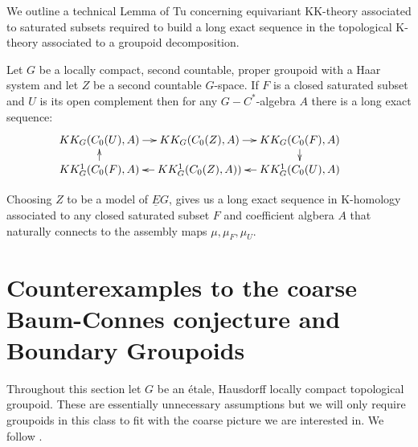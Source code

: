 We outline a technical Lemma of Tu concerning equivariant KK-theory associated to saturated subsets required to build a long exact sequence in the topological K-theory associated to a groupoid decomposition.

\begin{lemma}
Let $G$ be a locally compact, second countable, proper groupoid with a Haar system and let $Z$ be a second countable $G$-space. If $F$ is a closed saturated subset and $U$ is its open complement then for any $G-C^{*}$-algebra $A$ there is a long exact sequence:
\begin{equation*}
\xymatrix@=1em{
KK_{G}(C_{0}(U),A) \ar[r] & KK_{G}(C_{0}(Z),A) \ar[r]& KK_{G}(C_{0}(F),A)\ar[d] & \\
KK^{1}_{G}(C_{0}(F),A)\ar[u]& KK^{1}_{G}(C_{0}(Z),A)) \ar[l]& KK^{1}_{G}(C_{0}(U),A)\ar[l] &
}
\end{equation*}
\end{lemma}

Choosing $Z$ to be a model of $\underline{E}G$, gives us a long exact sequence in K-homology associated to any closed saturated subset $F$ and coefficient algbera $A$ that naturally connects to the assembly maps $\mu, \mu_{F}, \mu_{U}$.

\section{Counterexamples to the coarse Baum-Connes conjecture and Boundary Groupoids}\label{Sect:CE}

Throughout this section let $G$ be an \'etale, Hausdorff locally compact topological groupoid. These are essentially unnecessary assumptions but we will only require groupoids in this class to fit with the coarse picture we are interested in. We follow \cite{MR1911663}. 

